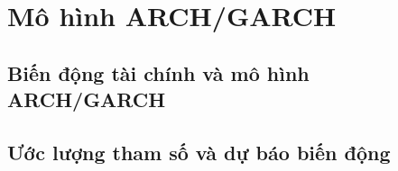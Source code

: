 \chapter{Mô hình ARCH/GARCH}
\section{Biến động tài chính và mô hình ARCH/GARCH}
\section{Ước lượng tham số và dự báo biến động}
